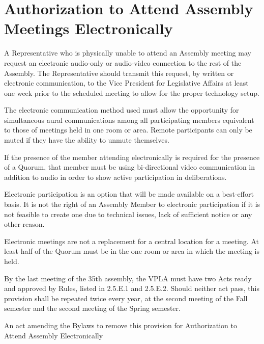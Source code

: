 \section{Authorization to Attend Assembly Meetings Electronically}
\begin{bylaws-number}
  \item A Representative who is physically unable to attend an Assembly meeting may request an electronic audio-only or audio-video connection to the rest of the Assembly. The Representative should transmit this request, by written or electronic communication, to the Vice President for Legislative Affairs at least one week prior to the scheduled meeting to allow for the proper technology setup.
  \item The electronic communication method used must allow the opportunity for simultaneous aural communications among all participating members equivalent to those of meetings held in one room or area. Remote participants can only be muted if they have the ability to unmute themselves.
  \begin{bylaws-number}
    \item If the presence of the member attending electronically is required for the presence of a Quorum, that member must be using bi-directional video communication in addition to audio in order to show active participation in deliberations.
  \end{bylaws-number}
  \item Electronic participation is an option that will be made available on a best-effort basis. It is not the right of an Assembly Member to electronic participation if it is not feasible to create one due to technical issues, lack of sufficient notice or any other reason.
  \item Electronic meetings are not a replacement for a central location for a meeting. At least half of the Quorum must be in the one room or area in which the meeting is held.
  \item By the last meeting of the 35th assembly, the VPLA must have two Acts ready and approved by Rules, listed in 2.5.E.1 and 2.5.E.2. Should neither act pass, this provision shall be repeated twice every year, at the second meeting of the Fall semester and the second meeting of the Spring semester.
  \begin{bylaws-number}
    \item An act amending the Bylaws to remove this provision for Authorization to Attend Assembly Electronically

\end{bylaws-number}
\end{bylaws-number}
